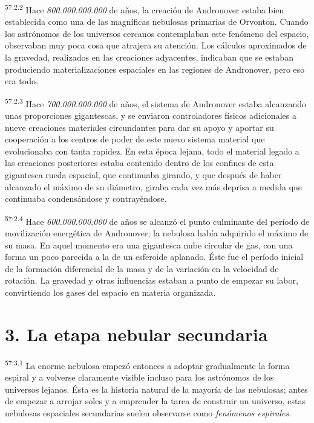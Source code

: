 \par
\textsuperscript{57:2.2} Hace \textit{800.000.000.000} de años, la creación de Andronover estaba bien establecida como una de las magníficas nebulosas primarias de Orvonton. Cuando los astrónomos de los universos cercanos contemplaban este fenómeno del espacio, observaban muy poca cosa que atrajera su atención. Los cálculos aproximados de la gravedad, realizados en las creaciones adyacentes, indicaban que se estaban produciendo materializaciones espaciales en las regiones de Andronover, pero eso era todo.

\par
\textsuperscript{57:2.3} Hace \textit{700.000.000.000} de años, el sistema de Andronover estaba alcanzando unas proporciones gigantescas, y se enviaron controladores físicos adicionales a nueve creaciones materiales circundantes para dar su apoyo y aportar su cooperación a los centros de poder de este nuevo sistema material que evolucionaba con tanta rapidez. En esta época lejana, todo el material legado a las creaciones posteriores estaba contenido dentro de los confines de esta gigantesca rueda espacial, que continuaba girando, y que después de haber alcanzado el máximo de su diámetro, giraba cada vez más deprisa a medida que continuaba condensándose y contrayéndose.

\par
\textsuperscript{57:2.4} Hace \textit{600.000.000.000} de años se alcanzó el punto culminante del período de movilización energética de Andronover; la nebulosa había adquirido el máximo de su masa. En aquel momento era una gigantesca nube circular de gas, con una forma un poco parecida a la de un esferoide aplanado. Éste fue el período inicial de la formación diferencial de la masa y de la variación en la velocidad de rotación. La gravedad y otras influencias estaban a punto de empezar su labor, convirtiendo los gases del espacio en materia organizada.

\section*{3. La etapa nebular secundaria}
\par
\textsuperscript{57:3.1} La enorme nebulosa empezó entonces a adoptar gradualmente la forma espiral y a volverse claramente visible incluso para los astrónomos de los universos lejanos. Ésta es la historia natural de la mayoría de las nebulosas; antes de empezar a arrojar soles y a emprender la tarea de construir un universo, estas nebulosas espaciales secundarias suelen observarse como \textit{fenómenos espirales}.

